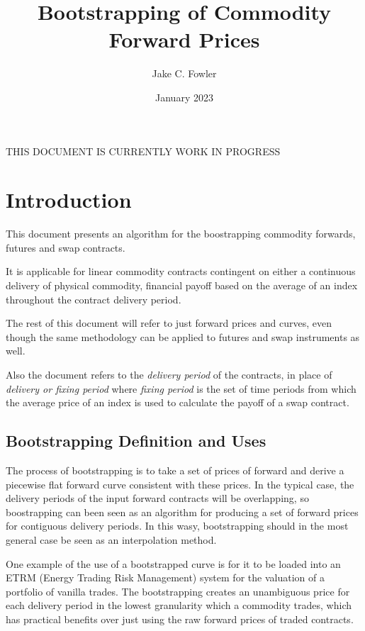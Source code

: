 \documentclass{article}
\title{Bootstrapping of Commodity Forward Prices}
\author{Jake C. Fowler}
\date{January 2023}
\begin{document}
\newcommand{\+}[1]{\ensuremath{\mathbf{#1}}}

\maketitle

THIS DOCUMENT IS CURRENTLY WORK IN PROGRESS

\section{Introduction}
This document presents an algorithm for the boostrapping commodity forwards, futures and swap 
contracts. 


It is applicable for linear commodity contracts contingent on either a continuous delivery
of physical commodity, financial payoff based on the average of an index throughout the
contract delivery period. 

The rest of this document will refer to just forward prices and curves, even though the same 
methodology can be applied to futures and swap instruments as well.

Also the document refers to the \emph{delivery period} of the contracts, in place of 
\emph{delivery or fixing period} where \emph{fixing period} is the set of time periods from 
which the average price of an index is used to calculate the payoff of a swap contract.

\subsection{Bootstrapping Definition and Uses}
The process of bootstrapping is to take a set of prices of forward and derive a piecewise 
flat forward curve consistent with these prices. In the typical case, the delivery periods 
of the input forward contracts will be overlapping, so boostrapping can been seen as an
algorithm for producing a set of forward prices for contiguous delivery periods. 
In this wasy, bootstrapping should in the most general case be seen as an interpolation method.


\bigskip

One example of the use of a bootstrapped curve is for it to be loaded into an ETRM
(Energy Trading Risk Management) system for the valuation of a portfolio of vanilla
trades. The bootstrapping creates an unambiguous price for each delivery period in the
lowest granularity which a commodity trades, which has practical benefits over just
using the raw forward prices of traded contracts.
\end{document}
